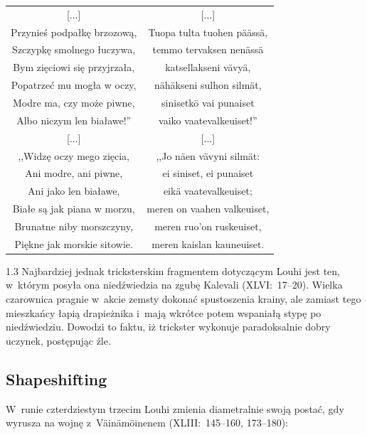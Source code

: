 \documentclass[11pt,a4paper,twoside]{report}
\begin{document}
{\centering
\small
\begin{longtable}{c c}
{[...]} & {[...]} \\
Przynieś podpałkę brzozową, & Tuopa tulta tuohen päässä, \\
Szczypkę smolnego łuczywa, & temmo tervaksen nenässä \\
Bym zięciowi się przyjrzała, & katsellakseni vävyä, \\
Popatrzeć mu mogła w oczy, & nähäkseni sulhon silmät, \\
Modre ma, czy może piwne, & sinisetkö vai punaiset \\
Albo niczym len białawe!'' & vaiko vaatevalkeuiset!'' \\
{[...]} & {[...]} \\
,,Widzę oczy mego zięcia, & ,,Jo näen vävyni silmät: \\
Ani modre, ani piwne, & ei siniset, ei punaiset \\
Ani jako len białawe, & eikä vaatevalkeuiset; \\
Białe są jak piana w morzu, & meren on vaahen valkeuiset, \\
Brunatne niby morszczyny, & meren ruo'on ruskeuiset, \\
Piękne jak morskie sitowie. & meren kaislan kauneuiset. \\
\end{longtable}
}
\begin{spacing}{1.3}
Najbardziej jednak tricksterskim fragmentem dotyczącym Louhi jest ten, w~którym posyła ona niedźwiedzia na zgubę Kalevali (XLVI:~17--20). Wielka czarownica pragnie w~akcie zemsty dokonać spustoszenia krainy, ale zamiast tego mieszkańcy łapią drapieżnika i~mają wkrótce potem wspaniałą stypę po niedźwiedziu. Dowodzi to faktu, iż trickster wykonuje paradoksalnie dobry uczynek, postępując źle.
\newpage
\subsection*{Shapeshifting}

W~runie czterdziestym trzecim Louhi zmienia diametralnie swoją postać, gdy wyrusza na wojnę z~Väinämöinenem (XLIII:~145--160, 173--180):
\end{spacing}
\end{document}
